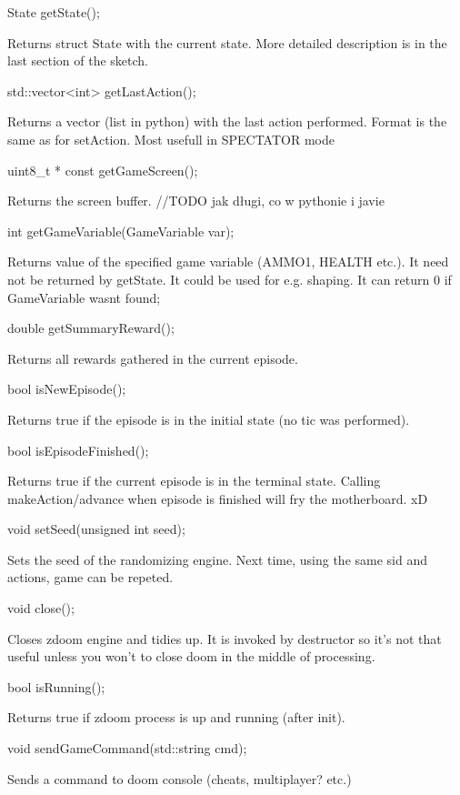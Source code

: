\begin{clinee}
	State getState();
\end{clinee}
Returns struct State with the current state. More detailed description is in the last section of the sketch.
\begin{clinee}
	std::vector<int> getLastAction();
\end{clinee}
Returns a vector (list in python) with the last action performed. Format is the same as for setAction.
Most usefull in SPECTATOR mode
\begin{clinee}
	uint8_t * const getGameScreen();
\end{clinee}
Returns the screen buffer. //TODO jak długi, co w pythonie i javie
\begin{clinee}
	int getGameVariable(GameVariable var);
\end{clinee}
Returns value of the specified game variable (AMMO1, HEALTH etc.). It need not be returned by getState.
It could be used for e.g. shaping. It can return 0 if GameVariable wasnt found;
\begin{clinee}
	double getSummaryReward();
\end{clinee}
Returns all rewards gathered in the current episode.
\begin{clinee}
	bool isNewEpisode();
\end{clinee}
Returns true if the episode is in the initial state (no tic was performed).
\begin{clinee}
	bool isEpisodeFinished();
\end{clinee}
Returns true if the current episode is in the terminal state.
Calling makeAction/advance when episode is finished will fry the motherboard. xD
\begin{clinee}
	void setSeed(unsigned int seed);
\end{clinee}
Sets the seed of the randomizing engine. Next time, using the same sid and actions, game can be repeted.
\begin{clinee}
	void close();
\end{clinee}
Closes zdoom engine and tidies up. It is invoked by destructor so it's not that useful unless you won't to close doom in the middle of processing.
\begin{clinee}
	bool isRunning();
\end{clinee}
Returns true if zdoom process is up and running (after init).
\begin{clinee}
	void sendGameCommand(std::string cmd);
\end{clinee}
Sends a command to doom console (cheats, multiplayer? etc.)
